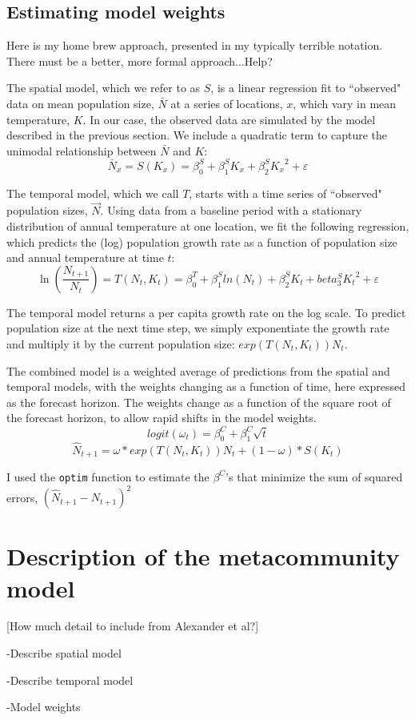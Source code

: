\documentclass[11pt]{article}
\begin{document}
\subsection{Estimating model weights}

Here is my home brew approach, presented in my typically terrible notation. There must be a better, more formal approach...Help?

The spatial model, which we refer to as $S$, is a linear regression fit to ``observed" data on mean population size, $\bar{N}$ at a series of locations, $x$, which vary in mean temperature, $K$. In our case, the observed data are simulated by the model described in the previous section. We include a quadratic term to capture the unimodal relationship between  $\bar{N}$ and $K$:
 \begin{equation}
 \bar{N}_x = S(K_x) = \beta^S_0 +  \beta^S_1 K_x +\beta^S_2 {K_x}^2 + \varepsilon
 \label{eqn:spatial_regression}
 \end{equation}

The temporal model, which we call $T$, starts with a time series of ``observed" population sizes, $\vec{N}$. Using data from a baseline period with a stationary distribution of annual temperature at one location, we fit the following regression, which predicts the (log) population growth rate as a function of population size and annual temperature at time $t$:
 \begin{equation}
 \ln(\frac{N_{t+1}}{N_t}) = T(N_t,K_t) = \beta^T_0 +  \beta^S_1 ln(N_t) +\beta^S_2 K_t + beta^S_3 {K_t}^2 +  \varepsilon
 \label{eqn:temporal_regression}
 \end{equation}
 
The temporal model returns a per capita growth rate on the log scale. To predict population size at the next time step, we simply exponentiate the growth rate and multiply it by the current population size: $exp(T(N_t,K_t)) N_t$.

The combined model is a weighted average of predictions from the spatial and temporal models, with the weights changing as a function of time, here expressed as the forecast horizon. The weights change as a function of the square root of the forecast horizon, to allow rapid shifts in the model weights. 
\begin{equation}
logit(\omega_t)=\beta^C_0 + \beta^C_1 \sqrt{t}
\label{eqn:weights}
\end{equation}
\begin{equation}
\hat{N}_{t+1} = \omega * exp(T(N_{t},K_t)) N_t + (1-\omega) * S(K_t) 
\label{eqn:combined_model}
\end{equation}

I used the \texttt{optim} function to estimate the $\beta^C$'s that minimize the sum of squared errors, $(\hat{N}_{t+1} - N_{t+1})^2$

\section{Description of the metacommunity model}

[How much detail to include from Alexander et al?]

-Describe spatial model

-Describe temporal model

-Model weights
\end{document}

